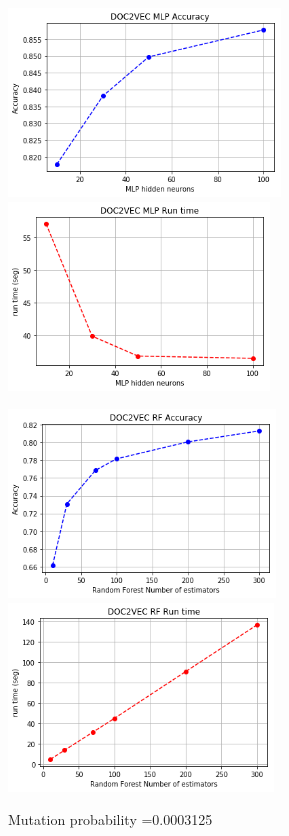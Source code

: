 \documentclass[oneside,onecolumn]{article}
\begin{document}
\begin{figure}[H]
	\includegraphics[height=5cm]{report_plot/plot_doc2vec/mlp_accuracy.png}
	\includegraphics[height=5cm]{report_plot/plot_doc2vec/mlp_runtime.png}
	
	\includegraphics[height=5cm]{report_plot/plot_doc2vec/rf_accuracy.png}
	\includegraphics[height=5cm]{report_plot/plot_doc2vec/rf_runtime.png}
	
	
	
	\caption{Mutation probability =0.0003125} 
	\label{fig:lowmutation}
\end{figure}
\end{document}
